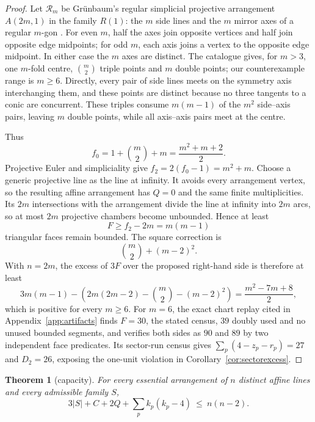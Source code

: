\documentclass[11pt]{article}
\newtheorem{theorem}{Theorem}
\theoremstyle{definition}
\begin{document}
\begin{proof}
Let $\mathcal R_m$ be Grünbaum's regular simplicial projective arrangement
$A(2m,1)$ in the family $R(1)$: the $m$ side lines and the $m$ mirror axes of
a regular $m$-gon \cite[pp.~2, 4]{Grunbaum2009}. For even $m$, half the axes
join opposite vertices and half join opposite edge midpoints; for odd $m$,
each axis joins a vertex to the opposite edge midpoint. In either case the
$m$ axes are distinct. The catalogue gives, for $m>3$, one $m$-fold centre,
$\binom m2$ triple points and $m$ double points; our counterexample range is
$m\ge6$. Directly, every pair of side lines meets on the symmetry axis
interchanging them, and these points are distinct because no three tangents
to a conic are concurrent. These triples consume $m(m-1)$ of the $m^2$
side--axis pairs, leaving $m$ double points, while all axis--axis pairs meet
at the centre.

Thus
\[
 f_0=1+\binom m2+m=\frac{m^2+m+2}{2}.
\]
Projective Euler and simpliciality give
$f_2=2(f_0-1)=m^2+m$. Choose a generic projective line as the line at
infinity. It avoids every arrangement vertex, so the resulting affine
arrangement has $Q=0$ and the same finite multiplicities. Its $2m$
intersections with the arrangement divide the line at infinity into $2m$
arcs, so at most $2m$ projective chambers become unbounded. Hence at least
\[
 F\ge f_2-2m=m(m-1)
\]
triangular faces remain bounded. The square correction is
\[
 \binom m2+(m-2)^2.
\]
With $n=2m$, the excess of $3F$ over the proposed right-hand side is therefore
at least
\[
 3m(m-1)-\left(2m(2m-2)-\binom m2-(m-2)^2\right)
 =\frac{m^2-7m+8}{2},
\]
which is positive for every $m\ge6$. For $m=6$, the exact chart replay cited
in Appendix~\ref{app:artifacts} finds $F=30$, the stated census, $39$ doubly
used and no unused bounded segments, and verifies both sides as $90$ and
$89$ by two independent face predicates. Its sector-run census gives
$\sum_p(4-z_p-r_p)=27$ and $D_2=26$, exposing the one-unit violation in
Corollary~\ref{cor:sectorexcess}.
\end{proof}



\begin{theorem}[capacity]\label{thm:capacity}
For every essential arrangement of $n$ distinct affine lines and every
admissible family $S$,
\begin{equation}\label{eq:capacity}
 3|S|+C+2Q+\sum_p k_p(k_p-4)\ \le\ n(n-2).
\end{equation}
\end{theorem}
\end{document}
